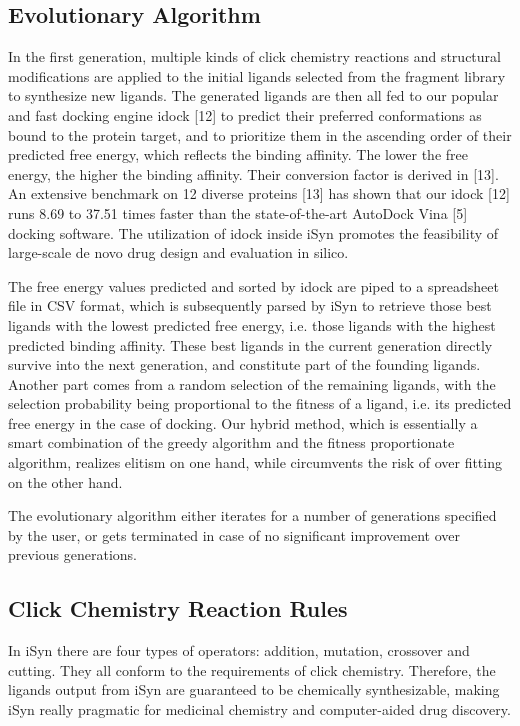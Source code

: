 \subsection{Evolutionary Algorithm}

In the first generation, multiple kinds of click chemistry reactions and structural modifications are applied to the initial ligands selected from the fragment library to synthesize new ligands. The generated ligands are then all fed to our popular and fast docking engine idock [12] to predict their preferred conformations as bound to the protein target, and to prioritize them in the ascending order of their predicted free energy, which reflects the binding affinity. The lower the free energy, the higher the binding affinity. Their conversion factor is derived in [13]. An extensive benchmark on 12 diverse proteins [13] has shown that our idock [12] runs 8.69 to 37.51 times faster than the state-of-the-art AutoDock Vina [5] docking software. The utilization of idock inside iSyn promotes the feasibility of large-scale de novo drug design and evaluation in silico.

The free energy values predicted and sorted by idock are piped to a spreadsheet file in CSV format, which is subsequently parsed by iSyn to retrieve those best ligands with the lowest predicted free energy, i.e. those ligands with the highest predicted binding affinity. These best ligands in the current generation directly survive into the next generation, and constitute part of the founding ligands. Another part comes from a random selection of the remaining ligands, with the selection probability being proportional to the fitness of a ligand, i.e. its predicted free energy in the case of docking. Our hybrid method, which is essentially a smart combination of the greedy algorithm and the fitness proportionate algorithm, realizes elitism on one hand, while circumvents the risk of over fitting on the other hand.

The evolutionary algorithm either iterates for a number of generations specified by the user, or gets terminated in case of no significant improvement over previous generations.

\subsection{Click Chemistry Reaction Rules}

In iSyn there are four types of operators: addition, mutation, crossover and cutting. They all conform to the requirements of click chemistry. Therefore, the ligands output from iSyn are guaranteed to be chemically synthesizable, making iSyn really pragmatic for medicinal chemistry and computer-aided drug discovery.

